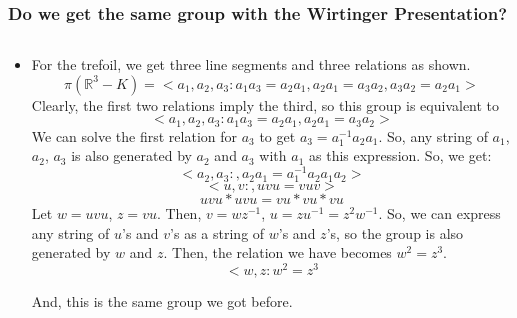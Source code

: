 \documentclass[8pt]{beamer}
\begin{document}
  \begin{frame}
    \frametitle{Do we get the same group with the Wirtinger Presentation?}
    \begin{columns}
      \begin{column}[T]{0.5\textwidth}
        \begin{itemize}
          \item For the trefoil, we get three line segments and three relations
            as shown.
            \[\pi(\mathbb{R}^3-K) = <a_1, a_2, a_3: a_1a_3 = a_2a_1, a_2a_1 = a_3a_2, a_3a_2 = a_2a_1>\]
            Clearly, the first two relations imply the third, so this group is equivalent to
            \[<a_1, a_2, a_3: a_1a_3 = a_2a_1, a_2a_1 = a_3a_2>\]
            We can solve the first relation for $a_3$ to get $a_3 =
            a_1^{-1}a_2a_1$. So, any string of $a_1$,$a_2$, $a_3$ is also
            generated by $a_2$ and $a_3$ with $a_1$ as this expression. So, we
            get:
            \[<a_2, a_3: , a_2a_1 = a_1^{-1}a_2a_1a_2>\]
            \[<u, v: , uvu = vuv>\]
            \[uvu*uvu = vu*vu*vu\]
            Let $w = uvu$, $z = vu$. Then, $v = wz^{-1}$, $u = zu^{-1} = z^2w^{-1}$.
            So, we can express any string of $u$'s and $v$'s as a string of
            $w$'s and $z$'s, so the group is also generated by $w$ and $z$. Then,
            the relation we have becomes $w^2 = z^3$.
            \[<w, z : w^2 = z^3\]

            And, this is the same group we got before.
        \end{itemize}
      \end{column}
    \end{columns}
  \end{frame}
\end{document}
